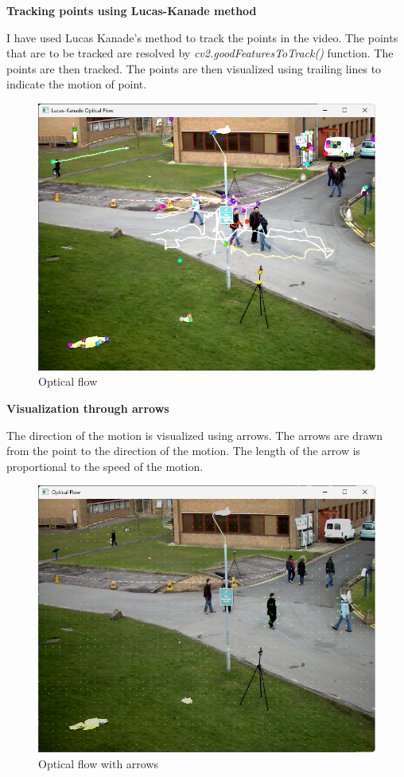 \textbf{Tracking points using Lucas-Kanade method}

I have used Lucas Kanade's method to track the points in the video. The points that are to be tracked are resolved by \textit{cv2.goodFeaturesToTrack()} function. The points are then tracked. The points are then visualized using trailing lines to indicate the motion of point.

\begin{figure}[H]
    \centering
    \includegraphics[width=1\textwidth]{res/lk_track.png}
    \caption{Optical flow}
    \label{fig:2.1}
\end{figure}

\newpage

\textbf{Visualization through arrows}

The direction of the motion is visualized using arrows. The arrows are drawn from the point to the direction of the motion. The length of the arrow is proportional to the speed of the motion.

\begin{figure}[H]
    \centering
    \includegraphics[width=1\textwidth]{res/optical_flow.png}
    \caption{Optical flow with arrows}
    \label{fig:2.2}
\end{figure}

